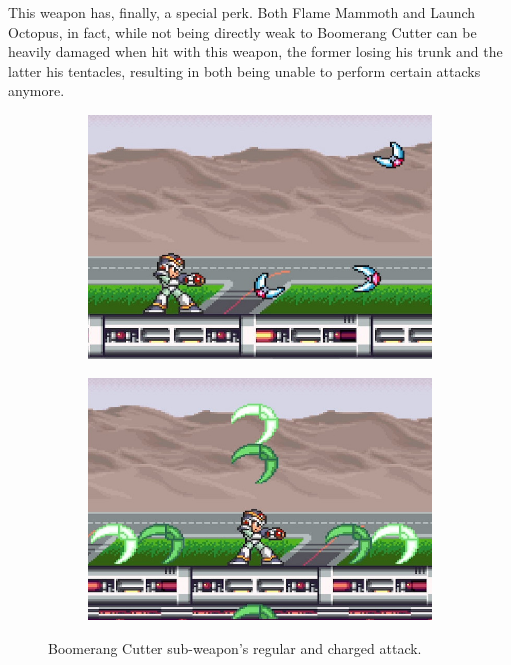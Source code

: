 This weapon has, finally, a special perk. Both Flame Mammoth and Launch Octopus, in fact, while not being directly weak to Boomerang Cutter can be heavily damaged when hit with this weapon, the former losing his trunk and the latter his tentacles, resulting in both being unable to perform certain attacks anymore.
\begin{figure}[htp]
	\centering
	\begin{subfigure}{0.3\linewidth}
		\includegraphics[width=\linewidth]{figures/X1/weapons/Boomerang_1.jpg}
	\end{subfigure}
	\begin{subfigure}{0.3\linewidth}
		\includegraphics[width=\linewidth]{figures/X1/weapons/Boomerang_2.jpg}
	\end{subfigure}
	\caption{Boomerang Cutter sub-weapon's regular and charged attack.}
\end{figure}

